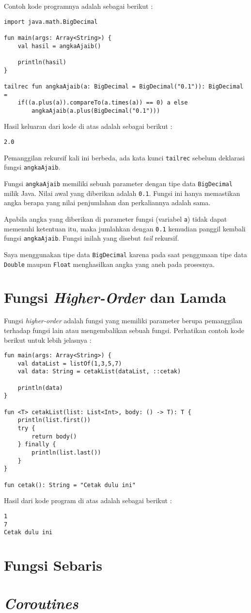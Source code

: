 Contoh kode programnya adalah sebagai berikut :

\begin{lstlisting}
import java.math.BigDecimal

fun main(args: Array<String>) {
	val hasil = angkaAjaib()
	
	println(hasil)
}

tailrec fun angkaAjaib(a: BigDecimal = BigDecimal("0.1")): BigDecimal =
	if((a.plus(a)).compareTo(a.times(a)) == 0) a else 
		angkaAjaib(a.plus(BigDecimal("0.1")))
\end{lstlisting}

Hasil keluaran dari kode di atas adalah sebagai berikut :

\begin{lstlisting}
2.0
\end{lstlisting}

Pemanggilan rekursif kali ini berbeda, ada kata kunci \texttt{tailrec} sebelum deklarasi fungsi \texttt{angkaAjaib}.

Fungsi \texttt{angkaAjaib} memiliki sebuah parameter dengan tipe data \texttt{BigDecimal} milik Java. Nilai awal yang diberikan adalah \texttt{0.1}. Fungsi ini hanya memastikan angka berapa yang nilai penjumlahan dan perkaliannya adalah sama.

Apabila angka yang diberikan di parameter fungsi (variabel \texttt{a}) tidak dapat memenuhi ketentuan itu, maka jumlahkan dengan \texttt{0.1} kemudian panggil kembali fungsi \texttt{angkaAjaib}. Fungsi inilah yang disebut \textit{tail} rekursif.

Saya menggunakan tipe data \texttt{BigDecimal} karena pada saat penggunaan tipe data \texttt{Double} maupun \texttt{Float} menghasilkan angka yang aneh pada prosesnya.

\section{Fungsi \textit{Higher-Order} dan Lamda}

Fungsi \textit{higher-order} adalah fungsi yang memiliki parameter berupa pemanggilan terhadap fungsi lain atau mengembalikan sebuah fungsi. Perhatikan contoh kode berikut untuk lebih jelasnya  :

\begin{lstlisting}
fun main(args: Array<String>) {
	val dataList = listOf(1,3,5,7)
	val data: String = cetakList(dataList, ::cetak)
	
	println(data)
}

fun <T> cetakList(list: List<Int>, body: () -> T): T {
	println(list.first())
	try {
		return body()
	} finally {
		println(list.last())
	}
}

fun cetak(): String = "Cetak dulu ini"
\end{lstlisting}

Hasil dari kode program di atas adalah sebagai berikut :

\begin{lstlisting}
1
7
Cetak dulu ini
\end{lstlisting}


\section{Fungsi Sebaris}

\section{\textit{Coroutines}}